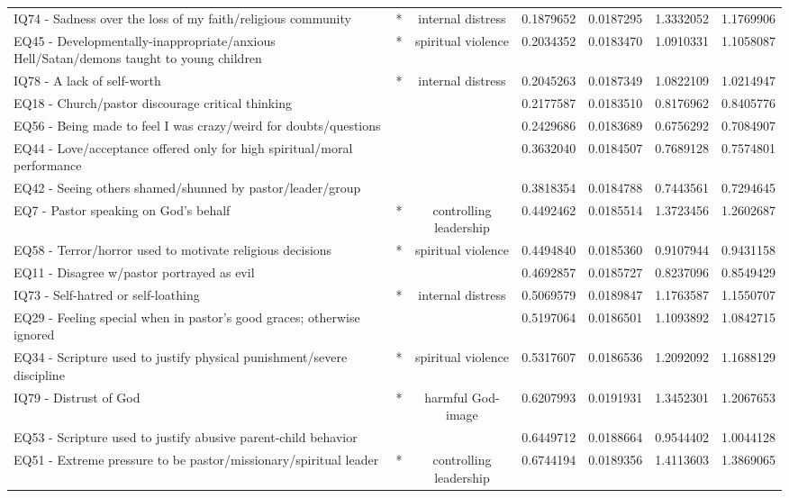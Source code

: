 \documentclass[
]{article}
\begin{document}
\begin{longtable}[t]{>{\raggedright\arraybackslash}p{11cm}cccccc}
*IQ74 - Sadness over the loss of my faith/religious community & * & internal distress & 0.1879652 & 0.0187295 & 1.3332052 & 1.1769906\\
*EQ45 - Developmentally-inappropriate/anxious Hell/Satan/demons taught to young children & * & spiritual violence & 0.2034352 & 0.0183470 & 1.0910331 & 1.1058087\\
*IQ78 - A lack of self-worth & * & internal distress & 0.2045263 & 0.0187349 & 1.0822109 & 1.0214947\\
EQ18 - Church/pastor discourage critical thinking &  &  & 0.2177587 & 0.0183510 & 0.8176962 & 0.8405776\\
\addlinespace
EQ56 - Being made to feel I was crazy/weird for doubts/questions &  &  & 0.2429686 & 0.0183689 & 0.6756292 & 0.7084907\\
EQ44 - Love/acceptance offered only for high spiritual/moral performance &  &  & 0.3632040 & 0.0184507 & 0.7689128 & 0.7574801\\
EQ42 - Seeing others shamed/shunned by pastor/leader/group &  &  & 0.3818354 & 0.0184788 & 0.7443561 & 0.7294645\\
*EQ7 - Pastor speaking on God's behalf & * & controlling leadership & 0.4492462 & 0.0185514 & 1.3723456 & 1.2602687\\
*EQ58 - Terror/horror used to motivate religious decisions & * & spiritual violence & 0.4494840 & 0.0185360 & 0.9107944 & 0.9431158\\
\addlinespace
EQ11 - Disagree w/pastor portrayed as evil &  &  & 0.4692857 & 0.0185727 & 0.8237096 & 0.8549429\\
*IQ73 - Self-hatred or self-loathing & * & internal distress & 0.5069579 & 0.0189847 & 1.1763587 & 1.1550707\\
EQ29 - Feeling special when in pastor’s good graces; otherwise ignored &  &  & 0.5197064 & 0.0186501 & 1.1093892 & 1.0842715\\
*EQ34 - Scripture used to justify physical punishment/severe discipline & * & spiritual violence & 0.5317607 & 0.0186536 & 1.2092092 & 1.1688129\\
*IQ79 - Distrust of God & * & harmful God-image & 0.6207993 & 0.0191931 & 1.3452301 & 1.2067653\\
\addlinespace
EQ53 - Scripture used to justify abusive parent-child behavior &  &  & 0.6449712 & 0.0188664 & 0.9544402 & 1.0044128\\
*EQ51 - Extreme pressure to be pastor/missionary/spiritual leader & * & controlling leadership & 0.6744194 & 0.0189356 & 1.4113603 & 1.3869065\\

\end{longtable}
\end{document}
